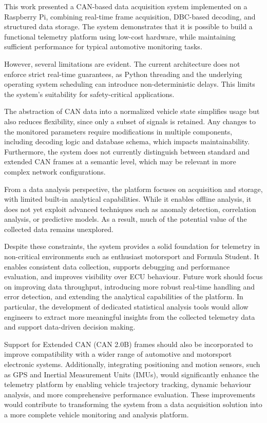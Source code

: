This work presented a CAN-based data acquisition system implemented on a Raspberry Pi, combining real-time frame acquisition, DBC-based decoding, and structured data storage. The system demonstrates that it is possible to build a functional telemetry platform using low-cost hardware, while maintaining sufficient performance for typical automotive monitoring tasks.

However, several limitations are evident. The current architecture does not enforce strict real-time guarantees, as Python threading and the underlying operating system scheduling can introduce non-deterministic delays. This limits the system's suitability for safety-critical applications.

The abstraction of CAN data into a normalized vehicle state simplifies usage but also reduces flexibility, since only a subset of signals is retained. Any changes to the monitored parameters require modifications in multiple components, including decoding logic and database schema, which impacts maintainability. Furthermore, the system does not currently distinguish between standard and extended CAN frames at a semantic level, which may be relevant in more complex network configurations.

From a data analysis perspective, the platform focuses on acquisition and storage, with limited built-in analytical capabilities. While it enables offline analysis, it does not yet exploit advanced techniques such as anomaly detection, correlation analysis, or predictive models. As a result, much of the potential value of the collected data remains unexplored.

Despite these constraints, the system provides a solid foundation for telemetry in non-critical environments such as enthusiast motorsport and Formula Student. It enables consistent data collection, supports debugging and performance evaluation, and improves visibility over ECU behaviour.
Future work should focus on improving data throughput, introducing more robust real-time handling and error detection, and extending the analytical capabilities of the platform.
In particular, the development of dedicated statistical analysis tools would allow engineers to extract more meaningful insights from the collected telemetry data and support data-driven decision making.
 
Support for Extended CAN (CAN 2.0B) frames should also be incorporated to improve compatibility with a wider range of automotive and motorsport electronic systems. Additionally, integrating positioning and motion sensors, such as GPS and Inertial Measurement Units (IMUs), would significantly enhance the telemetry platform by enabling vehicle trajectory tracking, dynamic behaviour analysis, and more comprehensive performance evaluation.
These improvements would contribute to transforming the system from a data acquisition solution into a more complete vehicle monitoring and analysis platform.
